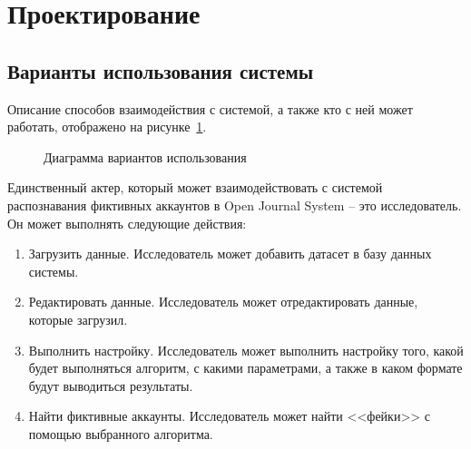 \newpage
\section{Проектирование}
\label{sec:designing}

\subsection{Варианты использования системы}
\label{subsec:Variants}
Описание способов взаимодействия с системой, а также кто с ней может работать, отображено на рисунке~\ref{ris:variantsUse}.

\begin{figure}[ht]
    \caption{Диаграмма вариантов использования}
    \label{ris:variantsUse}
\end{figure}

Единственный актер, который может взаимодействовать с системой распознавания фиктивных аккаунтов в Open Journal System -- это исследователь. Он может выполнять следующие действия:

\begin{enumerate}[itemindent=2cm, leftmargin=0cm, labelsep=0.3cm, topsep=0cm, itemsep=0cm, parsep=0cm, label=\arabic*., after=\vspace{-0.1cm}, before=\vspace{-0.1cm}]
    \item Загрузить данные. Исследователь может добавить датасет в базу данных системы.
    \item Редактировать данные. Исследователь может отредактировать данные, которые загрузил.
    \item Выполнить настройку. Исследователь может выполнить настройку того, какой будет выполняться алгоритм, с какими параметрами, а также в каком формате будут выводиться результаты.
    \item Найти фиктивные аккаунты. Исследователь может найти <<фейки>> с помощью выбранного алгоритма.
\end{enumerate}


\vspace{1.5em}
